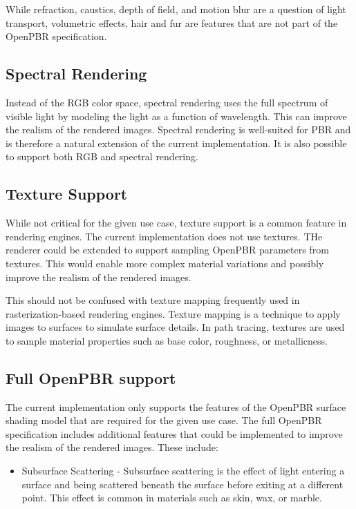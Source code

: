 While refraction, caustics, depth of field, and motion blur are a question of light transport, volumetric effects, hair and fur are features that are not part of the \gls{OpenPBR} specification.

\subsection*{Spectral Rendering}

Instead of the \gls{RGB} color space, spectral rendering uses the full spectrum of visible light by modeling the light as a function of wavelength. This can improve the realism of the rendered images. Spectral rendering is well-suited for \gls{PBR} and is therefore a natural extension of the current implementation. It is also possible to support both \gls{RGB} and spectral rendering.

\subsection*{Texture Support}

While not critical for the given use case, texture support is a common feature in rendering engines. The current implementation does not use textures. THe renderer could be extended to support sampling \gls{OpenPBR} parameters from textures. This would enable more complex material variations and possibly improve the realism of the rendered images.

This should not be confused with texture mapping frequently used in rasterization-based rendering engines. Texture mapping is a technique to apply images to surfaces to simulate surface details. In path tracing, textures are used to sample material properties such as base color, roughness, or metallicness.

\subsection*{Full OpenPBR support}

The current implementation only supports the features of the \gls{OpenPBR} surface shading model that are required for the given use case. The full \gls{OpenPBR} specification includes additional features that could be implemented to improve the realism of the rendered images. These include:

\begin{itemize}
    \item{Subsurface Scattering} - Subsurface scattering is the effect of light entering a surface and being scattered beneath the surface before exiting at a different point. This effect is common in materials such as skin, wax, or marble.
\end{itemize}


